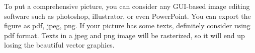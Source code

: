To put a comprehensive picture, you can consider any GUI-based image editing software such as photoshop, illustrator, or even PowerPoint. You can export the figure as pdf, jpeg, png. If your picture has some texts, definitely consider using pdf format. Texts in a jpeg and png image will be rasterized, so it will end up losing the beautiful vector graphics.
